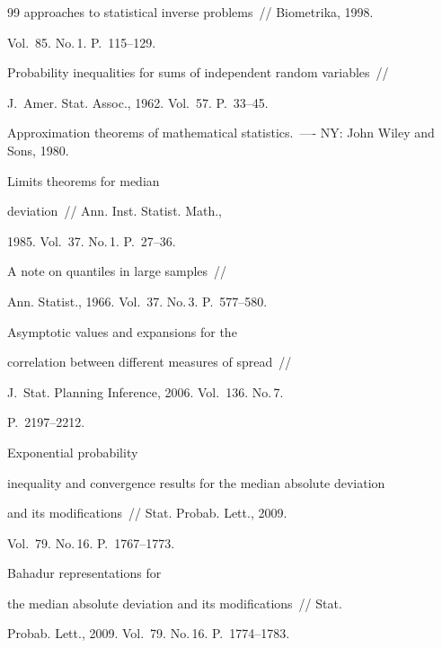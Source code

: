 {{\begin{thebibliography}{99}
approaches to statistical inverse problems~/\!\!/ Biometrika, 1998.

Vol.~85. No.\,1. P.~115--129.




 Probability inequalities for sums of independent random variables~/\!\!/ 

J.~Amer. Stat. Assoc., 1962. Vol.~57. P.~33--45.




 Approximation theorems of mathematical statistics.~---- NY: John Wiley and Sons, 1980.




 Limits theorems for median

deviation~/\!\!/ Ann. Inst. Statist. Math.,

1985. Vol.~37. No.\,1. P.~27--36.




 A note on quantiles in large samples~/\!\!/

Ann. Statist., 1966. Vol.~37. No.\,3. P.~577--580.




 Asymptotic values and expansions for the

correlation between different measures of spread~/\!\!/ 

J.~Stat. Planning Inference,  2006. Vol.~136. No.\,7.

P.~2197--2212.




 Exponential probability

inequality and convergence results for the median absolute deviation

and its modifications~/\!\!/ Stat. Probab. Lett., 2009.

Vol.~79. No.\,16. P.~1767--1773.



\label{end\stat}




 Bahadur representations for

the median absolute deviation and its modifications~/\!\!/ Stat.

Probab. Lett., 2009. Vol.~79. No.\,16. P.~1774--1783.





 \end{thebibliography}

}

}

